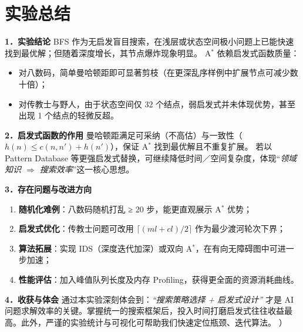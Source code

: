\documentclass[UTF8]{ctexart}
\begin{document}
\section*{实验总结}

\textbf{1．实验结论}  
BFS 作为无启发盲目搜索，在浅层或状态空间极小问题上已能快速找到最优解；但随着深度增长，其节点爆炸现象明显。  
A$^{*}$ 依赖启发式函数质量：  
\begin{itemize}
  \item 对八数码，简单曼哈顿距即可显著剪枝（在更深乱序样例中扩展节点可减少数十倍）；  
  \item 对传教士与野人，由于状态空间仅 32 个结点，弱启发式并未体现优势，甚至出现 1 个结点的轻微反超。
\end{itemize}

\textbf{2．启发式函数的作用}  
曼哈顿距满足可采纳（不高估）与一致性（$h(n) \leq c(n,n') + h(n')$），保证 A$^{*}$ 找到最优解且不重复扩展。  
若以 Pattern Data\-base 等更强启发式替换，可继续降低时间／空间复杂度，体现“\emph{领域知识 $\Rightarrow$ 搜索效率}”这一核心思想。

\textbf{3．存在问题与改进方向}  
\begin{enumerate}[label=(\alph*)]
  \item \textbf{随机化难例}：八数码随机打乱 ≥ 20 步，能更直观展示 A$^{*}$ 优势；  
  \item \textbf{启发式优化}：传教士问题可改用 $\lceil (ml+cl)/2 \rceil$ 作为最少渡河轮次下界；  
  \item \textbf{算法拓展}：实现 IDS（深度迭代加深）或双向 A$^{*}$，在有向无障碍图中可进一步加速；  
  \item \textbf{性能评估}：加入峰值队列长度及内存 Profiling，获得更全面的资源消耗曲线。
\end{enumerate}

\textbf{4．收获与体会}  
通过本实验深刻体会到：\emph{“搜索策略选择 + 启发式设计”} 才是 AI 问题求解效率的关键。掌握统一的搜索框架后，投入时间打磨启发式往往收益最高。此外，严谨的实验统计与可视化可帮助我们快速定位瓶颈、迭代算法。
）
\end{document}
